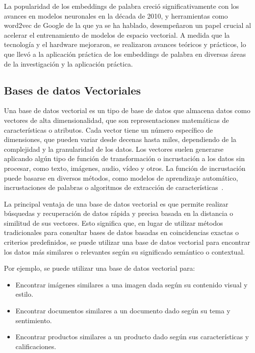 La popularidad de los embeddings de palabra creció significativamente con los avances en modelos neuronales en la década de 2010, y herramientas como word2vec de Google de la que ya se ha hablado, desempeñaron un papel crucial al acelerar el entrenamiento de modelos de espacio vectorial. A medida que la tecnología y el hardware mejoraron, se realizaron avances teóricos y prácticos, lo que llevó a la aplicación práctica de los embeddings de palabra en diversas áreas de la investigación y la aplicación práctica.

\subsection{Bases de datos Vectoriales}

Una base de datos vectorial es un tipo de base de datos que almacena datos como vectores de alta dimensionalidad, que son representaciones matemáticas de características o atributos. Cada vector tiene un número específico de dimensiones, que pueden variar desde decenas hasta miles, dependiendo de la complejidad y la granularidad de los datos. Los vectores suelen generarse aplicando algún tipo de función de transformación o incrustación a los datos sin procesar, como texto, imágenes, audio, vídeo y otros. La función de incrustación puede basarse en diversos métodos, como modelos de aprendizaje automático, incrustaciones de palabras o algoritmos de extracción de características~\cite{MicrosoftVectorDatabase}.

La principal ventaja de una base de datos vectorial es que permite realizar búsquedas y recuperación de datos rápida y precisa basada en la distancia o similitud de sus vectores. Esto significa que, en lugar de utilizar métodos tradicionales para consultar bases de datos basadas en coincidencias exactas o criterios predefinidos, se puede utilizar una base de datos vectorial para encontrar los datos más similares o relevantes según su significado semántico o contextual.

Por ejemplo, se puede utilizar una base de datos vectorial para:
\begin{itemize}
    \item Encontrar imágenes similares a una imagen dada según su contenido visual y estilo.
    \item Encontrar documentos similares a un documento dado según su tema y sentimiento.
    \item Encontrar productos similares a un producto dado según sus características y calificaciones.
\end{itemize}

